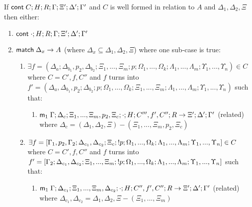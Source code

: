 \begin{theorem}
If $\mathsf{cont} \; C; H; R; \Gamma; \Xi'; \Delta'; \Gamma'$ and $C$ is well formed in relation to $A$ and $\Delta_1, \Delta_2, \Xi$ then either:

\begin{enumerate}
   \item $\mathsf{cont} \; \cdot; H; R; \Gamma; \Xi'; \Delta'; \Gamma'$
   \item $\mathsf{match} \; \Delta_x \rightarrow A$ (where $\Delta_x \subseteq \Delta_1, \Delta_2, \Xi$) where one sub-case is true:
   \begin{enumerate}
      \item $\exists f = (\Delta_a; \Delta_{b_1}, p_2, \Delta_{b_2}; \Xi_1, ..., \Xi_m; p; \Omega_1, ..., \Omega_k; \Lambda_1, ..., \Lambda_m; \Upsilon_1, ..., \Upsilon_n) \in C$ where $C = C', f, C''$ and $f$ turns into $f' = (\Delta_a, \Delta_{b_1}, p_2; \Delta_{b_2}; p; \Omega_1, ..., \Omega_k; \Xi_1, ..., \Xi_m; \Lambda_1, ..., \Lambda_m; \Upsilon_1, ..., \Upsilon_n)$ such that:
      \begin{enumerate}
         \item $\mathsf{m}_1 \; \Gamma; \Delta_c; \Xi_1, ..., \Xi_m, p_2, \Xi_c; \cdot; H; C''', f', C''; R \rightarrow \Xi'; \Delta'; \Gamma'$ (related) where $\Delta_c = (\Delta_1, \Delta_2, \Xi) - (\Xi_1, ..., \Xi_m, p_2, \Xi_c)$
      \end{enumerate}
      \item $\exists f = [\Gamma_1, p_2, \Gamma_2; \Delta_{c_1}, \Delta_{c_2}; \Xi_c; {!} p; \Omega_1, ..., \Omega_k; \Lambda_1, ..., \Lambda_m; \Upsilon_1, ..., \Upsilon_n] \in C$ where $C = C', f, C''$ and $f$ turns into $f' = [\Gamma_2; \Delta_{c_1}, \Delta_{c_2}; \Xi_1, ..., \Xi_m; {!} p; \Omega_1, ..., \Omega_k; \Lambda_1, ..., \Lambda_m; \Upsilon_1, ..., \Upsilon_n]$ such that:
      \begin{enumerate}
         \item $\mathsf{m}_1 \; \Gamma; \Delta_{c_1}; \Xi_1, ..., \Xi_m, \Delta_{c_2}; \cdot; H; C'', f', C''; R \rightarrow \Xi'; \Delta'; \Gamma'$ (related) where $\Delta_{c_1}, \Delta_{c_2} = \Delta_1, \Delta_2, \Xi - (\Xi_1, ..., \Xi_m)$
      \end{enumerate}
   \end{enumerate}
\end{enumerate}
\end{theorem}

